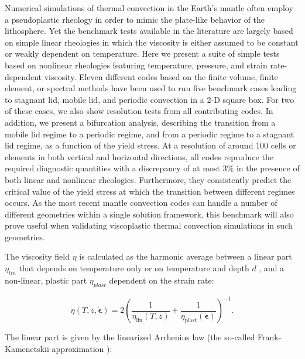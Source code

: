 \begin{center}
\begin{minipage}{13cm}
{\small
Numerical simulations of thermal convection in the Earth’s mantle often employ a pseudoplastic 
rheology in order to mimic the plate-like behavior of the lithosphere. Yet the benchmark tests available
in the literature are largely based on simple linear rheologies in which the viscosity is either assumed to be
constant or weakly dependent on temperature. Here we present a suite of simple tests based on nonlinear
rheologies featuring temperature, pressure, and strain rate-dependent viscosity. Eleven different codes
based on the finite volume, finite element, or spectral methods have been used to run five benchmark cases
leading to stagnant lid, mobile lid, and periodic convection in a 2-D square box. For two of these cases, we
also show resolution tests from all contributing codes. In addition, we present a bifurcation analysis, describing 
the transition from a mobile lid regime to a periodic regime, and from a periodic regime to a stagnant
lid regime, as a function of the yield stress. At a resolution of around 100 cells or elements in both vertical
and horizontal directions, all codes reproduce the required diagnostic quantities with a discrepancy of at
most 3\% in the presence of both linear and nonlinear rheologies. Furthermore, they consistently predict
the critical value of the yield stress at which the transition between different regimes occurs. As the most
recent mantle convection codes can handle a number of different geometries within a single solution
framework, this benchmark will also prove useful when validating viscoplastic thermal convection 
simulations in such geometries.}
\end{minipage}
\end{center}

The viscosity field $\eta$ is calculated as the harmonic average between a linear part $\eta_{lin}$ 
that depends on temperature only or on temperature and depth $d$ , and a non-linear,
plastic part $\eta_{plast}$ dependent on the strain rate:

\begin{equation}
\eta(T,z,\dot{\boldsymbol{\epsilon}}) = 
2 \left(\frac{1}{\eta_\text{lin}(T,z)} + \frac{1}{\eta_\text{plast}(\dot{\boldsymbol{\epsilon}})} \right)^{-1}. 
\label{eq:eta}
\end{equation}

The linear part is given by the linearized Arrhenius law (the so-called Frank-Kamenetskii approximation \cite{fran69}):

